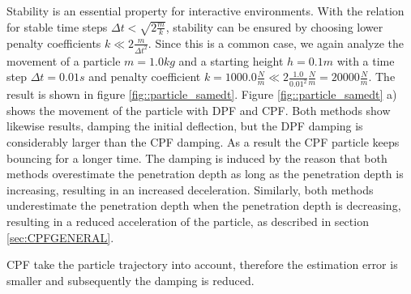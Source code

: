 Stability is an essential property for interactive environments. With the relation for stable time steps $\Delta t< \sqrt{2 \frac{m}{k}}$, stability can be ensured by choosing lower penalty coefficients $k \ll 2\frac{m}{\Delta t^2}$.
Since this is a common case, we again analyze the movement of a particle $m=1.0kg$ and a starting height $h=0.1m$ with a time step $\Delta t=0.01s$ and penalty coefficient $k=1000.0\frac{N}{m} \ll 2 \frac{1.0}{0.01^2}\frac{N}{m}=20000\frac{N}{m}$. 
The result is shown in figure \ref{fig::particle_samedt}.
Figure \ref{fig::particle_samedt} a) shows the movement of the particle with DPF and CPF.
Both methods show likewise results, damping the initial deflection, but the DPF damping is considerably larger than the CPF damping.
As a result the CPF particle keeps bouncing for a longer time.
The damping is induced by the reason that both methods overestimate the penetration depth as long as the penetration depth is increasing, resulting in an increased deceleration. Similarly, both methods underestimate the penetration depth when the penetration depth is decreasing, resulting in a reduced acceleration of the particle, as described in section \ref{sec:CPFGENERAL}.

CPF take the particle trajectory into account, therefore the estimation error is smaller and subsequently the damping is reduced.

